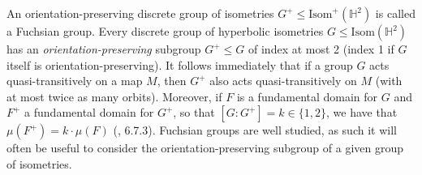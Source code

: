 \documentclass{article}
\numberwithin{equation}{section}
\newcommand{\HH}{\mathbb{H}}
\theoremstyle{definition}
\theoremstyle{remark}
\begin{document}
An orientation-preserving discrete group of isometries $G^+\leq \text{Isom}^+(\HH^2)$ is called a Fuchsian group.
Every discrete group of hyperbolic isometries $G\leq \text{Isom}(\HH^2)$ has an \textit{orientation-preserving} subgroup $ G^+\leq G $ of index at most 2 (index 1 if $G$ itself is orientation-preserving). It follows immediately that if a group $G$ acts quasi-transitively on a map $M$, then $G^+$ also acts quasi-transitively on $M$ (with at most twice as many orbits). Moreover, if $F$ is a fundamental domain for $G$ and $F^+$ a fundamental domain for $G^+$, so that $[G:G^+]=k\in\{1,2\}$, we have that $\mu(F^+)=k\cdot\mu(F)$ (\cite{Ratcliffe_manifolds}, 6.7.3).
Fuchsian groups are well studied, as such it will often be useful to consider the orientation-preserving subgroup of a given group of isometries. 
\end{document}
